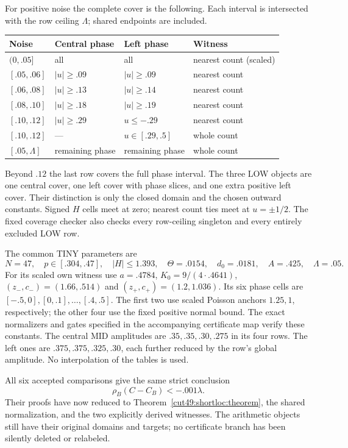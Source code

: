 \documentclass[11pt,a4paper]{article}
\numberwithin{equation}{section}
\theoremstyle{definition}
\theoremstyle{remark}
\begin{document}
For positive noise the complete cover is the following. Each interval is
intersected with the row ceiling $\Lambda$; shared endpoints are included.
\begin{center}\small
\begin{tabular}{@{}llll@{}}\toprule
Noise & Central phase & Left phase & Witness\\\midrule
$(0,.05]$ & all & all & nearest count (scaled)\\
$[.05,.06]$ & $|u|\ge.09$ & $|u|\ge.09$ & nearest count\\
$[.06,.08]$ & $|u|\ge.13$ & $|u|\ge.14$ & nearest count\\
$[.08,.10]$ & $|u|\ge.18$ & $|u|\ge.19$ & nearest count\\
$[.10,.12]$ & $|u|\ge.29$ & $u\le-.29$ & nearest count\\
$[.10,.12]$ & --- & $u\in[.29,.5]$ & whole count\\
$[.05,\Lambda]$ & remaining phase & remaining phase & whole count\\\bottomrule
\end{tabular}
\end{center}
Beyond $.12$ the last row covers the full phase interval. The three LOW
objects are one central cover, one left cover with phase slices, and one
extra positive left cover. Their distinction is only the closed domain
and the chosen outward constants. Signed $H$ cells meet at zero; nearest
count ties meet at $u=\pm1/2$. The fixed coverage checker also checks every
row-ceiling singleton and every entirely excluded LOW row.

The common TINY parameters are
\[
 N=47,\quad p\in[.304,.47],\quad |H|\le1.393,\quad
 \Theta=.0154,\quad d_0=.0181,\quad A=.425,\quad\Lambda=.05.
\]
For its scaled own witness use $a=.4784$, $K_0=9/(4\cdot.4641)$,
$(z_-,c_-)=(1.66,.514)$ and $(z_+,c_+)=(1.2,1.036)$.
Its six phase cells are $[-.5,0],[0,.1],\ldots,[.4,.5]$.
The first two use scaled Poisson anchors $1.25,1$, respectively; the other
four use the fixed positive normal bound. The exact normalizers and gates
specified in the accompanying certificate map verify these constants.
The central MID amplitudes are $.35,.35,.30,.275$ in its four rows.
The left ones are $.375,.375,.325,.30$, each further reduced by the row's
global amplitude. No interpolation of the tables is used.

All six accepted comparisons give the same strict conclusion
\[
                        \rho_B(C-C_B)<-.001\lambda.
\]
Their proofs have now reduced to Theorem~\ref{cut49:shortloc:theorem}, the shared
normalization, and the two explicitly derived witnesses. The arithmetic
objects still have their original domains and targets; no certificate
branch has been silently deleted or relabeled.
\end{document}

